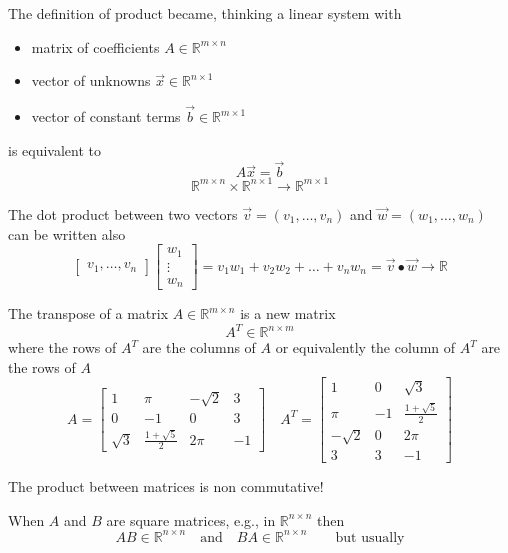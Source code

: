 The definition of product became, thinking a linear system with
\begin{itemize}
    \item[] matrix of coefficients $A \in \mathbb{R}^{m\times n}$
    \item[] vector of unknowns $\vec x \in \mathbb{R}^{n \times 1}$
    \item[] vector of constant terms $\vec b \in \mathbb{R}^{m \times 1}$
\end{itemize}
is equivalent to 
$$A \vec x = \vec b$$
$$\mathbb{R}^{m \times n} \times \mathbb{R}^{n \times 1} \to \mathbb{R}^{m \times 1}$$
\begin{remark}[Remark]
    The dot product between two vectors $\vec v = (v_1, \dots, v_n)$ and $\vec w = (w_1, \dots, w_n)$ can be written also
    $$\begin{bmatrix}
        v_1, \dots, v_n
    \end{bmatrix} \begin{bmatrix}
        w_1\\
        \vdots\\
        w_n
    \end{bmatrix} = v_1 w_1 + v_2 w_2 + \dots + v_n w_n = \vec v \bullet \vec w \to \mathbb{R}$$
\end{remark}
\begin{definition}
    The transpose of a matrix $A \in \mathbb{R}^{m\times n}$ is a new matrix 
    $$A^T \in \mathbb{R}^{n \times m}$$
    where the rows of $A^T$ are the columns of  $A$ or equivalently the column of $A^T$ are the rows of $A$
    $$A = \begin{bmatrix}
        1 &\pi &-\sqrt{2} &3\\
        0 &-1 &0 &3\\
        \sqrt{3} &\frac{1+\sqrt{5}}{2} &2\pi &-1
    \end{bmatrix} \quad A^T = \begin{bmatrix}
        1 &0 &\sqrt{3}\\
        \pi &-1 &\frac{1 + \sqrt{5}}{2}\\
        -\sqrt{2} &0 &2\pi\\
        3 &3 &-1
    \end{bmatrix}$$
\end{definition}
\begin{remark}[Remark]
    The product between matrices is non commutative!
\end{remark}
When $A$ and $B$ are square matrices, e.g., in $\mathbb{R}^{n\times n}$ then 
$$AB \in \mathbb{R}^{n \times n} \quad \text{and} \quad BA \in \mathbb{R}^{n \times n} \qquad \text{but usually}$$
